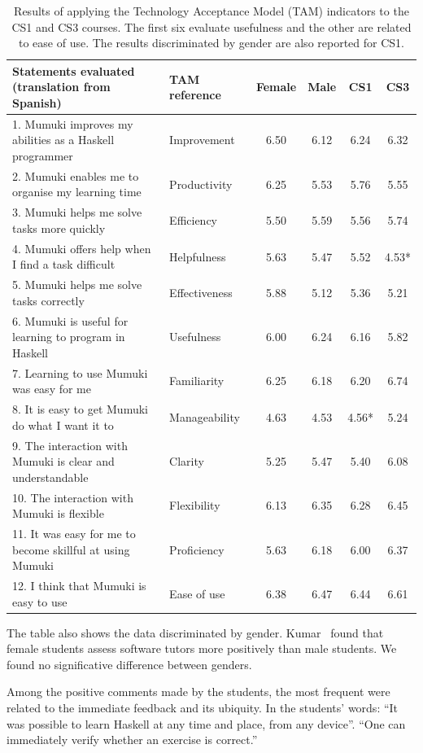 \begin{table}
\begin{tightcenter}
\begin{tabular}{|l|l|c|c|c|c|}
\hline
Statements evaluated (translation from Spanish)	&	TAM reference	&	Female &	Male &	CS1	&	CS3	\\
\hline
1. Mumuki improves my abilities as a Haskell programmer	&	Improvement	&	6.50	&	6.12	&	6.24	&	6.32	\\
2. Mumuki enables me to organise my learning time	&	Productivity	&	6.25	&	5.53	&	5.76	&	5.55	\\
3. Mumuki helps me solve tasks more quickly	&	Efficiency	&	5.50	&	5.59	&	5.56	&	5.74	\\
4. Mumuki offers help when I find a task difficult	&	Helpfulness &	5.63	&	5.47	&	5.52	&	4.53*	\\
5. Mumuki helps me solve tasks correctly	&	Effectiveness &	5.88	&	5.12	&	5.36	&	5.21	\\
6. Mumuki is useful for learning to program in Haskell	&	Usefulness &	6.00	&	6.24	&	6.16	&	5.82	\\
\hline
7. Learning to use Mumuki was easy for me	&	Familiarity 	&	6.25	&	6.18	&	6.20	&	6.74	\\
8. It is easy to get Mumuki do what I want it to 	&	Manageability 	&	4.63	&	4.53	&	4.56*	&	5.24	\\
9. The interaction with Mumuki is clear and understandable	&	Clarity 	&	5.25	&	5.47	&	5.40	&	6.08	\\
10. The interaction with Mumuki is flexible	&	Flexibility  	&	6.13	&	6.35	&	6.28	&	6.45	\\
11. It was easy for me to become skillful at using Mumuki 	&	Proficiency 	&	5.63	&	6.18	&	6.00	&	6.37	\\
12. I think that Mumuki is easy to use	&	Ease of use	&	6.38	&	6.47	&	6.44	&	6.61	\\
\hline
\end{tabular}
\end{tightcenter}
\caption{Results of applying the Technology Acceptance Model (TAM) indicators to the CS1 and CS3 courses. The first six evaluate usefulness and the other are related to ease of use. The results discriminated by gender are also reported for CS1.}\label{tam-ease-of-use}
\end{table}

The table also shows the data discriminated by gender. Kumar~\cite{Kumar:2008:Female} found that female students assess software tutors more positively than male students. We found no significative difference between genders.  

Among the positive comments made by the students, the most frequent were related to the immediate feedback and its ubiquity. In the students' words: ``It was possible to learn Haskell at any time and place, from any device''. ``One can immediately verify whether an exercise is correct.''



